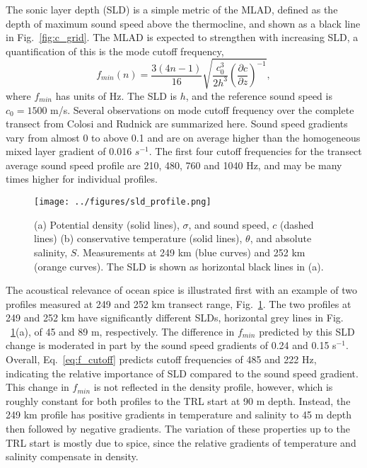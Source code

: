 \documentclass[preprint,NumberedRefs]{JASA}
\begin{document}
The sonic layer depth (SLD) is a simple metric of the MLAD, defined as the depth of maximum sound speed above the thermocline, and shown as a black line in Fig.~\ref{fig:c_grid}. The MLAD is expected to strengthen with increasing SLD, a quantification of this is the mode cutoff frequency\citep{Urick1982Prop},
\begin{equation}
    f_{min}(n) = \frac{3(4n-1)}{16} \sqrt{\frac{c_0^3}{2h^3} \left( \frac{\partial c}{\partial z} \right) ^ {-1}},
    \label{eq:f_cutoff}
\end{equation}
where $f_{min}$ has units of Hz. The SLD is $h$, and the reference sound speed is $c_0 = 1500$ m/s. Several observations on mode cutoff frequency over the complete transect from Colosi and Rudnick\cite{colosi2020observations} are summarized here. Sound speed gradients vary from almost 0 to above 0.1 and are on average higher than the homogeneous mixed layer gradient of 0.016 $s^{-1}$. The first four cutoff frequencies for the transect average sound speed profile are 210, 480, 760 and 1040 Hz, and may be many times higher for individual profiles.

\begin{figure}
    \texttt{[image: ../figures/sld\_profile.png]}
    \caption{\label{fig:profiles}{(a) Potential density (solid lines), $\sigma$, and sound speed, $c$ (dashed lines) (b) conservative temperature (solid lines), $\theta$, and absolute salinity, $S$. Measurements at 249 km (blue curves) and 252 km (orange curves). The SLD is shown as horizontal black lines in (a).}}
\end{figure}

The acoustical relevance of ocean spice is illustrated first with an example of two profiles measured at 249 and 252 km transect range, Fig.~\ref{fig:profiles}. The two profiles at 249 and 252 km have significantly different SLDs, horizontal grey lines in Fig. ~\ref{fig:profiles}(a), of 45 and 89 m, respectively. The difference in $f_{min}$ predicted by this SLD change is moderated in part by the sound speed gradients of 0.24 and 0.15 s$^{-1}$. Overall, Eq.~\eqref{eq:f_cutoff} predicts cutoff frequencies of 485 and 222 Hz, indicating the relative importance of SLD compared to the sound speed gradient. This change in $f_{min}$ is not reflected in the density profile, however, which is roughly constant for both profiles to the TRL start at 90 m depth. Instead, the 249 km profile has positive gradients in temperature and salinity to 45 m depth then followed by negative gradients. The variation of these properties up to the TRL start is mostly due to spice, since the relative gradients of temperature and salinity compensate in density.
\end{document}
